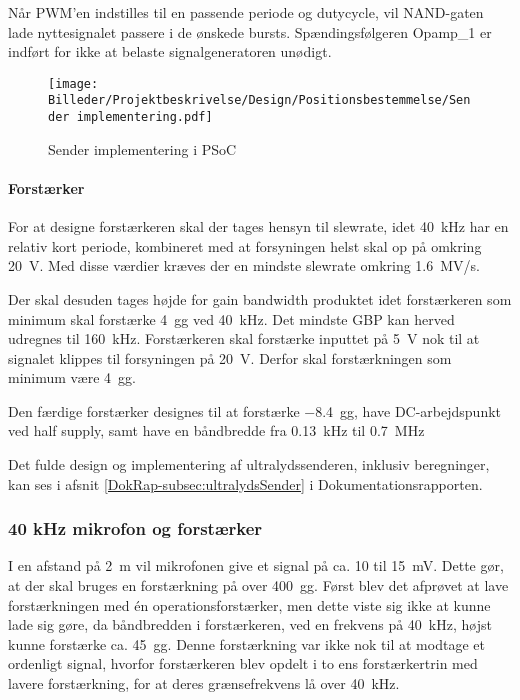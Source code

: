 Når PWM'en indstilles til en passende periode og dutycycle, vil NAND-gaten lade nyttesignalet passere i de ønskede bursts. Spændingsfølgeren Opamp\_1 er indført for ikke at belaste signalgeneratoren unødigt.

\begin{figure}[htb]
	\centering
	\texttt{[image: Billeder/Projektbeskrivelse/Design/Positionsbestemmelse/Sender implementering.pdf]} 
	\caption{Sender implementering i PSoC}
	\label{fig:senderImplementeringHW}
\end{figure}


\paragraph{Forstærker} For at designe forstærkeren skal der tages hensyn til slewrate, idet \SI{40}{kHz} har en relativ kort periode, kombineret med at forsyningen helst skal op på omkring \SI{20}{V}. Med disse værdier kræves der en mindste slewrate omkring \SI{1,6}{MV/s}.

Der skal desuden tages højde for gain bandwidth produktet idet forstærkeren som minimum skal forstærke \SI{4}{gg} ved \SI{40}{kHz}. Det mindste GBP kan herved udregnes til \SI{160}{kHz}.\newline
Forstærkeren skal forstærke inputtet på \SI{5}{V} nok til at signalet klippes til forsyningen på \SI{20}{V}. Derfor skal forstærkningen som minimum være \SI{4}{gg}. 

Den færdige forstærker designes til at forstærke \SI{-8,4}{gg}, have DC-arbejdspunkt ved half supply, samt have en båndbredde fra \SI{0,13}{kHz} til \SI{0,7}{MHz}


Det fulde design og implementering af ultralydssenderen, inklusiv beregninger, kan ses i afsnit \vref{DokRap-subsec:ultralydsSender} i Dokumentationsrapporten.


\subsubsection*{40 kHz mikrofon og forstærker}

I en afstand på \SI{2}{m} vil mikrofonen give et signal på ca. 10 til \SI{15}{mV}. Dette gør, at der skal bruges en forstærkning på over \SI{400}{gg}.\newline
Først blev det afprøvet at lave forstærkningen med én operationsforstærker, men dette viste sig ikke at kunne lade sig gøre, da båndbredden i forstærkeren, ved en frekvens på \SI{40}{kHz}, højst kunne forstærke ca. \SI{45}{gg}. Denne forstærkning var ikke nok til at modtage et ordenligt signal, hvorfor forstærkeren blev opdelt i to ens forstærkertrin med lavere forstærkning, for at deres grænsefrekvens lå over \SI{40}{kHz}.

